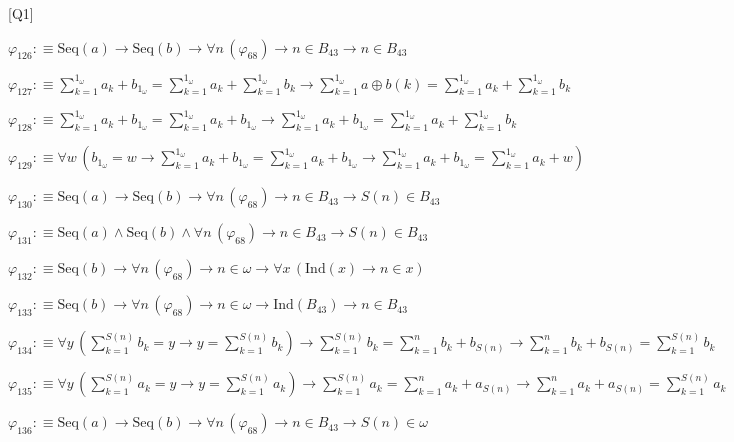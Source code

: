 \begin{fullproof}{[Q1]}
\begin{abbrevlist}
\item $\varphi_{126} :\equiv \mathrm{Seq}(a) \to \mathrm{Seq}(b) \to \forall n\,(\varphi_{68}) \to n \in B_{43} \to n \in B_{43}$
\item $\varphi_{127} :\equiv {\textstyle\sum_{k=1}^{1_{\omega}} a_{k}} + b_{1_{\omega}} = {\textstyle\sum_{k=1}^{1_{\omega}} a_{k}} + {\textstyle\sum_{k=1}^{1_{\omega}} b_{k}} \to {\textstyle\sum_{k=1}^{1_{\omega}} a \oplus b(k)} = {\textstyle\sum_{k=1}^{1_{\omega}} a_{k}} + {\textstyle\sum_{k=1}^{1_{\omega}} b_{k}}$
\item $\varphi_{128} :\equiv {\textstyle\sum_{k=1}^{1_{\omega}} a_{k}} + b_{1_{\omega}} = {\textstyle\sum_{k=1}^{1_{\omega}} a_{k}} + b_{1_{\omega}} \to {\textstyle\sum_{k=1}^{1_{\omega}} a_{k}} + b_{1_{\omega}} = {\textstyle\sum_{k=1}^{1_{\omega}} a_{k}} + {\textstyle\sum_{k=1}^{1_{\omega}} b_{k}}$
\item $\varphi_{129} :\equiv \forall w\,(b_{1_{\omega}} = w \to {\textstyle\sum_{k=1}^{1_{\omega}} a_{k}} + b_{1_{\omega}} = {\textstyle\sum_{k=1}^{1_{\omega}} a_{k}} + b_{1_{\omega}} \to {\textstyle\sum_{k=1}^{1_{\omega}} a_{k}} + b_{1_{\omega}} = {\textstyle\sum_{k=1}^{1_{\omega}} a_{k}} + w)$
\item $\varphi_{130} :\equiv \mathrm{Seq}(a) \to \mathrm{Seq}(b) \to \forall n\,(\varphi_{68}) \to n \in B_{43} \to S(n) \in B_{43}$
\item $\varphi_{131} :\equiv \mathrm{Seq}(a) \land \mathrm{Seq}(b) \land \forall n\,(\varphi_{68}) \to n \in B_{43} \to S(n) \in B_{43}$
\item $\varphi_{132} :\equiv \mathrm{Seq}(b) \to \forall n\,(\varphi_{68}) \to n \in \omega \to \forall x\,(\mathrm{Ind}(x) \to n \in x)$
\item $\varphi_{133} :\equiv \mathrm{Seq}(b) \to \forall n\,(\varphi_{68}) \to n \in \omega \to \mathrm{Ind}(B_{43}) \to n \in B_{43}$
\item $\varphi_{134} :\equiv \forall y\,({\textstyle\sum_{k=1}^{S(n)} b_{k}} = y \to y = {\textstyle\sum_{k=1}^{S(n)} b_{k}}) \to {\textstyle\sum_{k=1}^{S(n)} b_{k}} = {\textstyle\sum_{k=1}^{n} b_{k}} + b_{S(n)} \to {\textstyle\sum_{k=1}^{n} b_{k}} + b_{S(n)} = {\textstyle\sum_{k=1}^{S(n)} b_{k}}$
\item $\varphi_{135} :\equiv \forall y\,({\textstyle\sum_{k=1}^{S(n)} a_{k}} = y \to y = {\textstyle\sum_{k=1}^{S(n)} a_{k}}) \to {\textstyle\sum_{k=1}^{S(n)} a_{k}} = {\textstyle\sum_{k=1}^{n} a_{k}} + a_{S(n)} \to {\textstyle\sum_{k=1}^{n} a_{k}} + a_{S(n)} = {\textstyle\sum_{k=1}^{S(n)} a_{k}}$
\item $\varphi_{136} :\equiv \mathrm{Seq}(a) \to \mathrm{Seq}(b) \to \forall n\,(\varphi_{68}) \to n \in B_{43} \to S(n) \in \omega$

\end{abbrevlist}
\end{fullproof}
